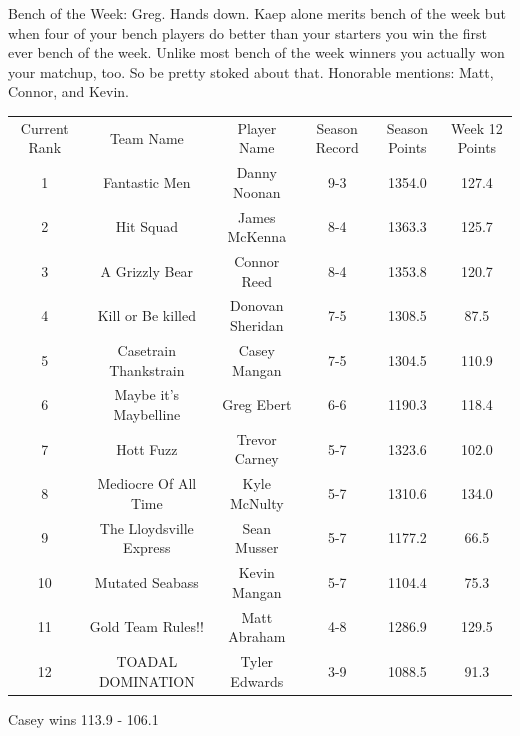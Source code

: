 \documentclass[11pt,letterpaper]{article}
\begin{document}
\noindent Bench of the Week: Greg. Hands down. Kaep alone merits bench of the week but when four of your bench players do better than your starters you win the first ever bench of the week. Unlike most bench of the week winners you actually won your matchup, too. So be pretty stoked about that. Honorable mentions: Matt, Connor, and Kevin.

\newpage
{}
\vspace{-25pt}
\begin{table} [h]
\footnotesize
\begin{center}
\begin{tabular} { c c c c c c }
\\[3mm] Current Rank & Team Name & Player Name & Season Record &  Season Points & Week 12 Points
\\[3mm] 1 & Fantastic Men & Danny Noonan & 9-3 & 1354.0 & 127.4
\\ 2 & Hit Squad & James McKenna & 8-4 & 1363.3 & 125.7
\\ 3 & A Grizzly Bear & Connor Reed & 8-4 & 1353.8 & 120.7
\\ 4 & Kill or Be killed & Donovan Sheridan & 7-5 & 1308.5 & 87.5 
\\ 5 & Casetrain Thankstrain & Casey Mangan & 7-5 & 1304.5 & 110.9
\\ 6 & Maybe it's Maybelline & Greg Ebert & 6-6 & 1190.3 & 118.4
\\ 7 & Hott Fuzz & Trevor Carney & 5-7 & 1323.6 & 102.0
\\ 8 & Mediocre Of All Time & Kyle McNulty & 5-7 & 1310.6 & 134.0
\\ 9 & The Lloydsville Express & Sean Musser & 5-7 & 1177.2 & 66.5
\\ 10 & Mutated Seabass & Kevin Mangan & 5-7 & 1104.4 & 75.3
\\ 11 & Gold Team Rules!! & Matt Abraham & 4-8 & 1286.9 & 129.5
\\ 12 & TOADAL DOMINATION & Tyler Edwards & 3-9 & 1088.5 & 91.3
\end{tabular}
\end{center}
\end{table}




\newpage
{}



\par\noindent Casey wins 113.9 - 106.1
\bigskip
\par\noindent
\end{document}

